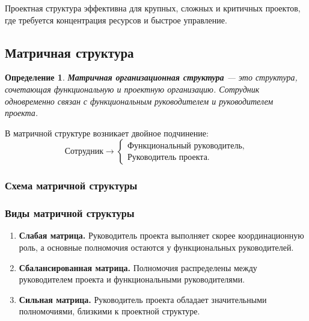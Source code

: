 \documentclass[12pt,a4paper]{article}
\newtheorem{definition}{Определение}
\begin{document}
Проектная структура эффективна для крупных, сложных и критичных проектов, где требуется концентрация ресурсов и быстрое управление.

\subsection{Матричная структура}

\begin{definition}
\textbf{Матричная организационная структура} --- это структура, сочетающая функциональную и проектную организацию. Сотрудник одновременно связан с функциональным руководителем и руководителем проекта.
\end{definition}

В матричной структуре возникает двойное подчинение:
\[
\text{Сотрудник}
\rightarrow
\begin{cases}
\text{Функциональный руководитель},\\
\text{Руководитель проекта}.
\end{cases}
\]

\subsubsection*{Схема матричной структуры}

\begin{center}
\end{center}

\subsubsection*{Виды матричной структуры}
\begin{enumerate}
    \item \textbf{Слабая матрица.} Руководитель проекта выполняет скорее координационную роль, а основные полномочия остаются у функциональных руководителей.
    \item \textbf{Сбалансированная матрица.} Полномочия распределены между руководителем проекта и функциональными руководителями.
    \item \textbf{Сильная матрица.} Руководитель проекта обладает значительными полномочиями, близкими к проектной структуре.
\end{enumerate}
\end{document}
